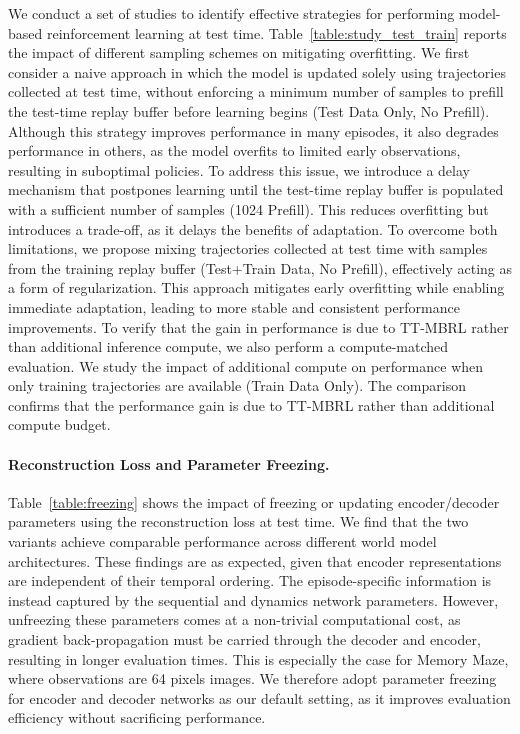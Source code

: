 We conduct a set of studies to identify effective strategies for performing model-based reinforcement learning at test time. Table~\ref{table:study_test_train} reports the impact of different sampling schemes on mitigating overfitting.
We first consider a naive approach in which the model is updated solely using trajectories collected at test time, without enforcing a minimum number of samples to prefill the test-time replay buffer before learning begins (Test Data Only, No Prefill). Although this strategy improves performance in many episodes, it also degrades performance in others, as the model overfits to limited early observations, resulting in suboptimal policies.
To address this issue, we introduce a delay mechanism that postpones learning until the test-time replay buffer is populated with a sufficient number of samples (1024 Prefill). This reduces overfitting but introduces a trade-off, as it delays the benefits of adaptation.
To overcome both limitations, we propose mixing trajectories collected at test time with samples from the training replay buffer (Test+Train Data, No Prefill), effectively acting as a form of regularization. This approach mitigates early overfitting while enabling immediate adaptation, leading to more stable and consistent performance improvements.
To verify that the gain in performance is due to TT-MBRL rather than additional inference compute, we also perform a compute-matched evaluation. We study the impact of additional compute on performance when only training trajectories are available (Train Data Only). The comparison confirms that the performance gain is due to TT-MBRL rather than additional compute budget.



\paragraph{Reconstruction Loss and Parameter Freezing.} Table~\ref{table:freezing} shows the impact of freezing or updating encoder/decoder parameters using the reconstruction loss at test time. We find that the two variants achieve comparable performance across different world model architectures. These findings are as expected, given that encoder representations are independent of their temporal ordering. The episode-specific information is instead captured by the sequential and dynamics network parameters. However, unfreezing these parameters comes at a non-trivial computational cost, as gradient back-propagation must be carried through the decoder and encoder, resulting in longer evaluation times. This is especially the case for Memory Maze, where observations are 64 pixels images. We therefore adopt parameter freezing for encoder and decoder networks as our default setting, as it improves evaluation efficiency without sacrificing performance.

